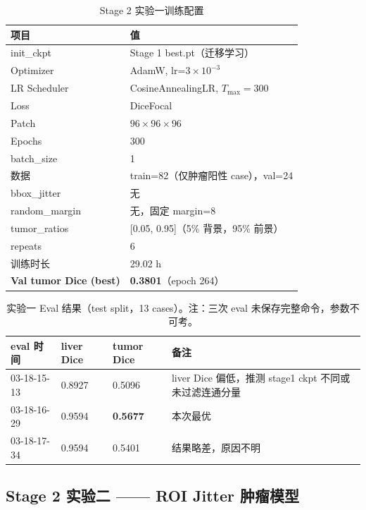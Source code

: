 \documentclass{article}
\begin{document}
	\begin{table}[H]
		\centering
		\caption{Stage 2 实验一训练配置}
		\begin{tabular}{ll}
			\hline
			\textbf{项目} & \textbf{值} \\
			\hline
			init\_ckpt      & Stage 1 best.pt（迁移学习） \\
			Optimizer       & AdamW, lr=$3\times10^{-3}$ \\
			LR Scheduler    & CosineAnnealingLR, $T_{\max}=300$ \\
			Loss            & DiceFocal \\
			Patch           & $96\times96\times96$ \\
			Epochs          & 300 \\
			batch\_size     & 1 \\
			数据            & train=82（仅肿瘤阳性 case），val=24 \\
			bbox\_jitter    & 无 \\
			random\_margin  & 无，固定 margin=8 \\
			tumor\_ratios   & [0.05, 0.95]（5\% 背景，95\% 前景） \\
			repeats         & 6 \\
			训练时长        & 29.02 h \\
			\hline
			\textbf{Val tumor Dice (best)} & \textbf{0.3801}（epoch 264） \\
			\hline
		\end{tabular}
	\end{table}
	
	\begin{table}[H]
		\centering
		\caption{实验一 Eval 结果（test split，13 cases）。注：三次 eval 未保存完整命令，参数不可考。}
		\begin{tabular}{llll}
			\hline
			\textbf{eval 时间} & \textbf{liver Dice} & \textbf{tumor Dice} & \textbf{备注} \\
			\hline
			03-18-15-13 & 0.8927 & 0.5096 & liver Dice 偏低，推测 stage1 ckpt 不同或未过滤连通分量 \\
			03-18-16-29 & 0.9594 & \textbf{0.5677} & 本次最优 \\
			03-18-17-34 & 0.9594 & 0.5401 & 结果略差，原因不明 \\
			\hline
		\end{tabular}
	\end{table}
	
	\subsection{Stage 2 实验二 —— ROI Jitter 肿瘤模型}
	
\end{document}
